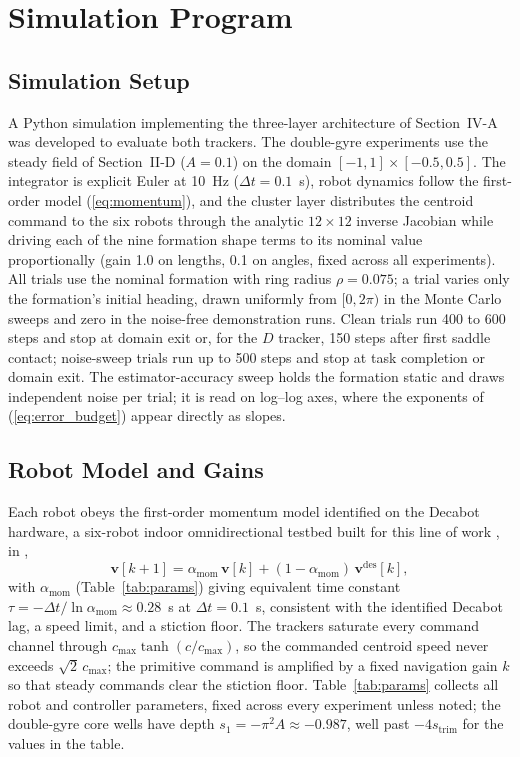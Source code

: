 \documentclass[lettersize,journal]{IEEEtran}
\begin{document}
\section{Simulation Program}
\label{sec:methods}

\subsection{Simulation Setup}

A Python simulation implementing the three-layer architecture of
Section~\mbox{IV-A} was developed to evaluate both trackers.
The double-gyre experiments use the steady field of
Section~\mbox{II-D} ($A = 0.1$) on the domain $[-1, 1] \times
[-0.5, 0.5]$. The integrator is explicit Euler at 10~Hz ($\Delta t =
0.1$~s), robot dynamics follow the first-order model
(\ref{eq:momentum}), and the cluster layer distributes the centroid
command to the six robots through the analytic $12 \times 12$ inverse
Jacobian while driving each of the nine formation shape terms to its
nominal value proportionally (gain 1.0 on lengths, 0.1 on angles, fixed
across all experiments). All trials use the nominal formation with ring
radius $\rho = 0.075$; a trial varies only the formation's initial
heading, drawn uniformly from $[0, 2\pi)$ in the Monte Carlo sweeps and
zero in the noise-free demonstration runs. Clean trials run 400 to 600
steps and stop at domain exit or, for the $D$ tracker, 150 steps after
first saddle contact; noise-sweep trials run up to 500 steps and stop
at task completion or domain exit. The estimator-accuracy sweep holds
the formation static and draws independent noise per trial; it is read
on log--log axes, where the exponents of (\ref{eq:error_budget}) appear
directly as slopes.

\subsection{Robot Model and Gains}
\label{sec:robot_model}

Each robot obeys the first-order momentum model identified on the
Decabot hardware, a six-robot indoor omnidirectional testbed built for
this line of work \cite{32,33}, in \cite{14},
\begin{equation}
    \mathbf{v}[k+1] = \alpha_{\text{mom}}\,\mathbf{v}[k]
    + (1 - \alpha_{\text{mom}})\,\mathbf{v}^{\text{des}}[k],
    \label{eq:momentum}
\end{equation}
with $\alpha_{\text{mom}}$ (Table~\ref{tab:params}) giving equivalent
time constant $\tau = -\Delta t/\ln\alpha_{\text{mom}} \approx 0.28$~s
at $\Delta t = 0.1$~s, consistent with the identified Decabot lag, a
speed limit, and a stiction floor.
The trackers saturate every command channel through
$c_{\max}\tanh(c/c_{\max})$, so the commanded centroid speed never
exceeds $\sqrt{2}\,c_{\max}$; the primitive command is amplified by a
fixed navigation gain $k$ so that steady commands clear the stiction
floor. Table~\ref{tab:params} collects all robot and controller
parameters, fixed across every experiment unless noted; the double-gyre
core wells have depth $s_1 = -\pi^2 A \approx -0.987$, well past
$-4s_{\mathrm{trim}}$ for the values in the table.
\end{document}

